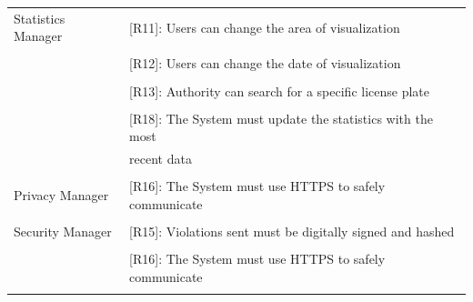 \documentclass{article}
\begin{document}
\begin{center}
\begin{tabular}{ | l | l |}
        \hline
        Statistics Manager & [R11]: Users can change the area of visualization \\\\
                           & [R12]: Users can change the date of visualization \\\\
                           & [R13]: Authority can search for a specific license plate \\\\
                           & [R18]: The System must update the statistics with the most \\
                           & recent data \\\\
        \hline
        Privacy Manager & [R16]: The System must use HTTPS to safely communicate \\\\

        \hline
        Security Manager & [R15]: Violations sent must be digitally signed and hashed \\\\
                         & [R16]: The System must use HTTPS to safely communicate \\\\
        \hline
    \end{tabular}
    \end{center}
\end{document}
